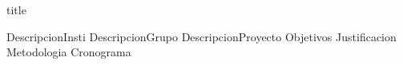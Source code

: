 \documentclass{article}
\begin{document}
{title}

\frontmatter

\tableofcontents





\mainmatter{}




{DescripcionInsti}
{DescripcionGrupo}
{DescripcionProyecto}
{Objetivos}
{Justificacion}
{Metodologia}
{Cronograma}


\newpage

\nocite{gomez2010introduccion}







\end{document}
